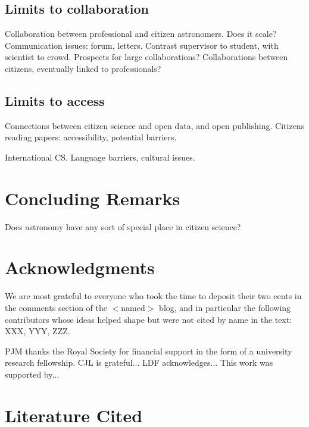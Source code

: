 \documentclass{ar2e}
\begin{document}
\subsection{Limits to collaboration}
\label{sec:limits:collab}

Collaboration between professional and citizen astronomers. Does it scale?
Communication issues: forum, letters. Contrast supervisor to student, with
scientist to crowd. Prospects for large collaborations? Collaborations between
citizens, eventually linked to professionals?



\subsection{Limits to access}
\label{sec:limits:access}

Connections between citizen science and open data, and open publishing. 
Citizens reading papers: accessibility, potential barriers. 

International CS. Language barriers, cultural issues. 



\section{Concluding Remarks}
\label{sec:conclusions}

Does astronomy have any sort of special place in citizen science?



\section*{Acknowledgments}

We are most grateful to everyone who took the time to deposit their two cents in
the comments section of the $<$named$>$ blog, and in particular the following
contributors whose ideas helped shape  but were not cited by
name in the text: XXX, YYY, ZZZ. 

PJM thanks the Royal Society for financial support in the form of a university
research fellowship.
%
CJL is grateful...
%
LDF acknowledges...
% 
This work was supported by...


\section{Literature Cited}





\end{document}
